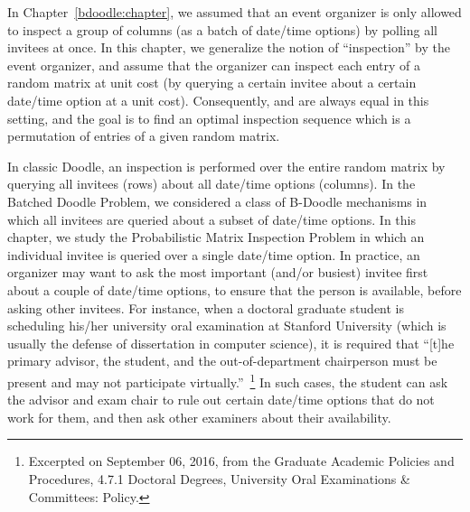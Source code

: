 \label{matrix:chapter}


In Chapter~\ref{bdoodle:chapter}, we assumed that an event organizer is only allowed to inspect a group of columns (as a batch of date/time options) by polling all invitees at once.
In this chapter, we generalize the notion of ``inspection'' by the event organizer, and assume that the organizer can inspect each entry of a random matrix at unit cost (by querying a certain invitee about a certain date/time option at a unit cost).
Consequently, \Times and \Inconveniences are always equal in this setting, and the goal is to find an optimal inspection sequence which is a permutation of entries of a given random matrix.

In classic Doodle, an inspection is performed over the entire random matrix by querying all invitees (rows) about all date/time options (columns).
In the Batched Doodle Problem, we considered a class of B-Doodle mechanisms in which all invitees are queried about a subset of date/time options.
In this chapter, we study the Probabilistic Matrix Inspection Problem in which an individual invitee is queried over a single date/time option. In practice, an organizer may want to ask the most important (and/or busiest) invitee first about a couple of date/time options, to ensure that the person is available, before asking other invitees. For instance, when a doctoral graduate student is scheduling his/her university oral examination at Stanford University (which is usually the defense of dissertation in computer science), it is required that
``[t]he primary advisor, the student, and the out-of-department chairperson must be present and may not participate virtually.''~\footnote{
Excerpted on September 06, 2016, from the Graduate Academic Policies and Procedures,
4.7.1 Doctoral Degrees, University Oral Examinations & Committees: Policy.
}
In such cases, the student can ask the advisor and exam chair to rule out certain date/time options that do not work for them, and then ask other examiners about their availability. 

